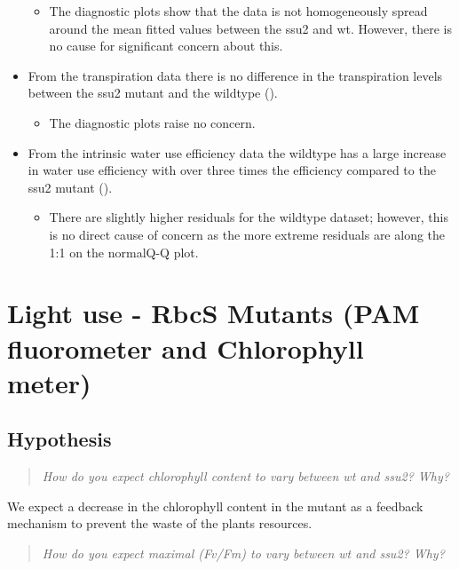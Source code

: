 \documentclass[
]{article}
\begin{document}
\begin{itemize}
  \begin{itemize}
  \tightlist
  \item
    The diagnostic plots show that the data is not homogeneously spread
    around the mean fitted values between the ssu2 and wt. However,
    there is no cause for significant concern about this.
  \end{itemize}
\item
  From the transpiration data there is no difference in the
  transpiration levels between the ssu2 mutant and the wildtype ({}).

  \begin{itemize}
  \tightlist
  \item
    The diagnostic plots raise no concern.
  \end{itemize}
\item
  From the intrinsic water use efficiency data the wildtype has a large
  increase in water use efficiency with over three times the efficiency
  compared to the ssu2 mutant ({}).

  \begin{itemize}
  \tightlist
  \item
    There are slightly higher residuals for the wildtype dataset;
    however, this is no direct cause of concern as the more extreme
    residuals are along the 1:1 on the normalQ-Q plot.
  \end{itemize}
\end{itemize}

\section{Light use - RbcS Mutants (PAM fluorometer and Chlorophyll
meter)}\label{light-use---rbcs-mutants-pam-fluorometer-and-chlorophyll-meter}

\subsection{Hypothesis}\label{hypothesis}

\begin{quote}
\emph{How do you expect chlorophyll content to vary between wt and ssu2?
Why?}
\end{quote}

We expect a decrease in the chlorophyll content in the mutant as a
feedback mechanism to prevent the waste of the plant\textquotesingle s
resources.

\begin{quote}
\emph{How do you expect maximal {} (Fv/Fm) to vary between wt and ssu2?
Why?}
\end{quote}
\end{document}
